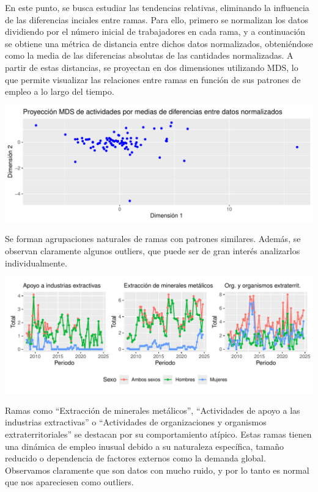 \documentclass[Universitat de
València,article,submit,moreauthors,pdftex]{Definitions/mdpi}
\begin{document}
En este punto, se busca estudiar las tendencias relativas, eliminando la
influencia de las diferencias inciales entre ramas. Para ello, primero
se normalizan los datos dividiendo por el número inicial de trabajadores
en cada rama, y a continuación se obtiene una métrica de distancia entre
dichos datos normalizados, obteniéndose como la media de las diferencias
absolutas de las cantidades normalizadas. A partir de estas distancias,
se proyectan en dos dimensiones utilizando MDS, lo que permite
visualizar las relaciones entre ramas en función de sus patrones de
empleo a lo largo del tiempo.

\includegraphics{ProyectoAED2024_files/figure-latex/unnamed-chunk-42-1.pdf}

Se forman agrupaciones naturales de ramas con patrones similares.
Además, se observan claramente algunos outliers, que puede ser de gran
interés analizarlos individualmente.

\includegraphics{ProyectoAED2024_files/figure-latex/unnamed-chunk-43-1.pdf}

Ramas como ``Extracción de minerales metálicos'', ``Actividades de apoyo
a las industrias extractivas'' o ``Actividades de organizaciones y
organismos extraterritoriales'' se destacan por su comportamiento
atípico. Estas ramas tienen una dinámica de empleo inusual debido a su
naturaleza específica, tamaño reducido o dependencia de factores
externos como la demanda global. Observamos claramente que son datos con
mucho ruido, y por lo tanto es normal que nos apareciesen como outliers.
\end{document}
